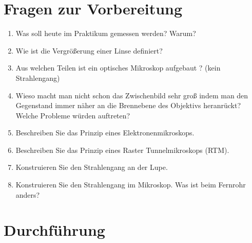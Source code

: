 \section{Fragen zur Vorbereitung}

\begin{enumerate}
 \item Was soll heute im Praktikum gemessen werden? Warum?
 \item Wie ist die Vergrößerung einer Linse definiert?
 \item Aus welchen Teilen ist ein optisches Mikroskop aufgebaut ? (kein Strahlengang)
 \item Wieso macht man nicht schon das Zwischenbild sehr groß indem man den Gegenstand immer näher an die Brennebene des Objektivs heranrückt? Welche Probleme würden auftreten?
 \item Beschreiben Sie das Prinzip eines Elektronenmikroskops.
 \item Beschreiben Sie das Prinzip eines Raster Tunnelmikroskops (RTM).
 \item Konstruieren Sie den Strahlengang an der Lupe.
 \item Konstruieren Sie den Strahlengang im Mikroskop. Was ist beim Fernrohr anders?
%
\end{enumerate}

\section{Durchführung} 




